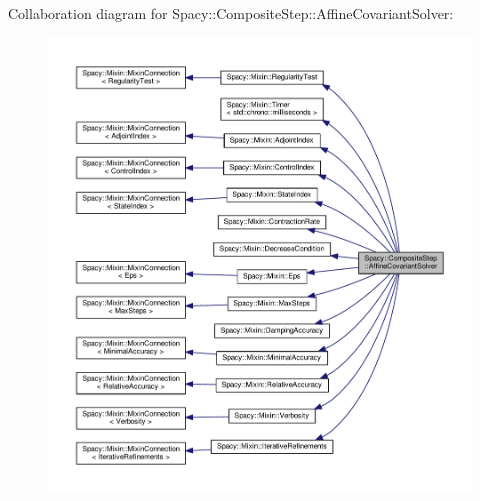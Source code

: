 Collaboration diagram for Spacy\+:\+:Composite\+Step\+:\+:Affine\+Covariant\+Solver\+:\nopagebreak
\begin{figure}[H]
\begin{center}
\leavevmode
\includegraphics[width=350pt]{classSpacy_1_1CompositeStep_1_1AffineCovariantSolver__coll__graph}
\end{center}
\end{figure}
